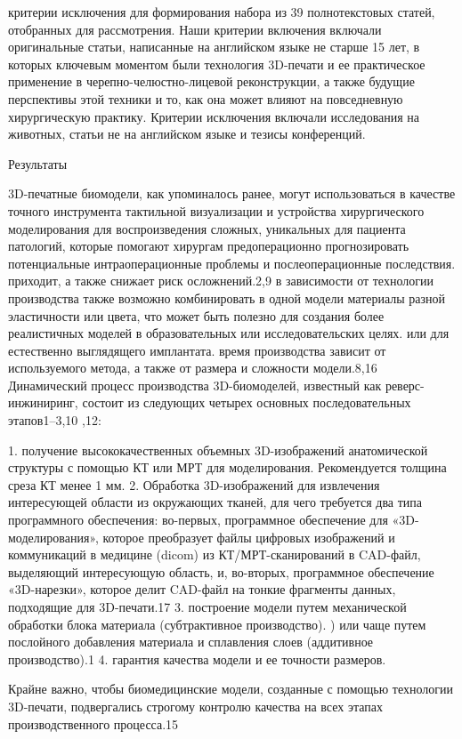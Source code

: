 критерии исключения для формирования набора из 39 полнотекстовых статей,
отобранных для рассмотрения. Наши критерии включения включали оригинальные
статьи, написанные на английском языке не старше 15 лет, в которых ключевым
моментом были технология 3D-печати и ее практическое применение в
черепно-челюстно-лицевой реконструкции, а также будущие перспективы этой техники
и то, как она может влияют на повседневную хирургическую практику. Критерии
исключения включали исследования на животных, статьи не на английском языке и
тезисы конференций.

Результаты

3D-печатные биомодели, как упоминалось ранее, могут использоваться в качестве
точного инструмента тактильной визуализации и устройства хирургического
моделирования для воспроизведения сложных, уникальных для пациента патологий,
которые помогают хирургам предоперационно прогнозировать потенциальные
интраоперационные проблемы и послеоперационные последствия. приходит, а также
снижает риск осложнений.2,9 в зависимости от технологии производства также
возможно комбинировать в одной модели материалы разной эластичности или цвета,
что может быть полезно для создания более реалистичных моделей в образовательных
или исследовательских целях. или для естественно выглядящего имплантата. время
производства зависит от используемого метода, а также от размера и сложности
модели.8,16 Динамический процесс производства 3D-биомоделей, известный как
реверс-инжиниринг, состоит из следующих четырех основных последовательных
этапов1–3,10 ,12:

1. получение высококачественных объемных 3D-изображений анатомической структуры
с помощью КТ или МРТ для моделирования. Рекомендуется толщина среза КТ менее 1
мм. 
2. Обработка 3D-изображений для извлечения интересующей области из
окружающих тканей, для чего требуется два типа программного обеспечения:
во-первых, программное обеспечение для «3D-моделирования», которое преобразует
файлы цифровых изображений и коммуникаций в медицине (dicom) из
КТ/МРТ-сканирований в CAD-файл, выделяющий интересующую область, и, во-вторых,
программное обеспечение «3D-нарезки», которое делит CAD-файл на тонкие фрагменты
данных, подходящие для 3D-печати.17 
3. построение модели путем механической
обработки блока материала (субтрактивное производство). ) или чаще путем
послойного добавления материала и сплавления слоев (аддитивное производство).1
4. гарантия качества модели и ее точности размеров.

Крайне важно, чтобы биомедицинские модели, созданные с помощью технологии
3D-печати, подвергались строгому контролю качества на всех этапах
производственного процесса.15
                                                               
